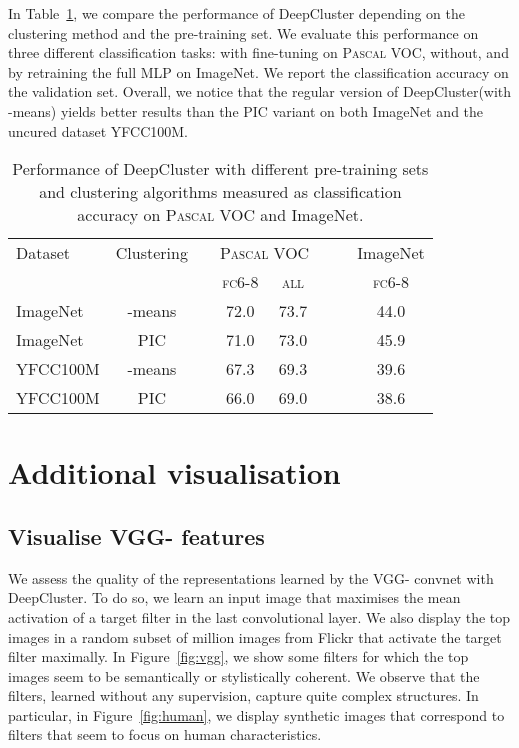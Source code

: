 \documentclass[runningheads]{llncs}
\def\OURS{DeepCluster\xspace}
\begin{document}
In Table~\ref{tab:classif}, we compare the performance of \OURS depending on the clustering method and the pre-training set.
We evaluate this performance on three different classification tasks: with fine-tuning on \textsc{Pascal} VOC, without, and by retraining the full MLP on ImageNet.
We report the classification accuracy on the validation set.
Overall, we notice that the regular version of \OURS (with -means) yields better results than the PIC variant on both ImageNet and the uncured dataset YFCC100M.

\begin{table}[h!]
  \centering
  \begin{tabular}{@{}lcccccc@{}}
    \toprule
     Dataset & Clustering&& \multicolumn{2}{c}{\textsc{Pascal} VOC} &~~& ImageNet \\
                                        \cmidrule{4-5} \cmidrule{7-7}
        &&& \textsc{fc6-8} & \textsc{all} && \textsc{fc6-8} \\
    \midrule
    ImageNet & -means && 72.0  & 73.7  && 44.0  \\
    ImageNet & PIC        && 71.0  & 73.0  && 45.9 \\
    YFCC100M & -means  && 67.3  & 69.3  && 39.6 \\
    YFCC100M & PIC        && 66.0  & 69.0  && 38.6 \\
    \bottomrule
  \end{tabular}
  \caption{
    Performance of \OURS with different pre-training sets and clustering algorithms measured as classification accuracy on \textsc{Pascal} VOC and ImageNet.
  }
  \label{tab:classif}
\end{table}

\section{Additional visualisation}
\subsection{Visualise VGG- features}
We assess the quality of the representations learned by the VGG- convnet with \OURS.
To do so, we learn an input image that maximises the mean activation of a target filter in the last convolutional layer.
We also display the top  images in a random subset of  million images from Flickr that activate the target filter maximally.
In Figure~\ref{fig:vgg}, we show some filters for which the top  images seem to be semantically or stylistically coherent.
We observe that the filters, learned without any supervision, capture quite complex structures.
In particular, in Figure~\ref{fig:human}, we display synthetic images that correspond to filters that seem to focus on human characteristics.
\end{document}
